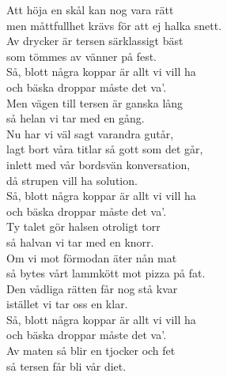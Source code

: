 \documentclass[a6paper, 10pt, twoside]{article}
\begin{document}
\noindent
\begin{center}
\end{center}
\begin{lyrics}
Att höja en skål kan nog vara rätt \\
men måttfullhet krävs för att ej halka snett. \\
Av drycker är tersen särklassigt bäst \\
som tömmes av vänner på fest. \\\digitalonly{\\}
Så, blott några koppar är allt vi vill ha \\
och bäska droppar måste det va'. \\
Men vägen till tersen är ganska lång \\
så helan vi tar med en gång. 
\vspace{5pt} \\
Nu har vi väl sagt varandra gutår, \\
lagt bort våra titlar så gott som det går, \\
inlett med vår bordsvän konversation, \\
då strupen vill ha solution. \\\digitalonly{\\}
Så, blott några koppar är allt vi vill ha \\
och bäska droppar måste det va'. \\
Ty talet gör halsen otroligt torr \\
så halvan vi tar med en knorr. 
\vspace{5pt} \\
Om vi mot förmodan äter nån mat \\
så bytes vårt lammkött mot pizza på fat. \\
Den vådliga rätten får nog stå kvar \\
istället vi tar oss en klar. \\\digitalonly{\\}
Så, blott några koppar är allt vi vill ha \\
och bäska droppar måste det va'. \\
Av maten så blir en tjocker och fet \\
så tersen får bli vår diet. 
\end{lyrics}
\end{document}
